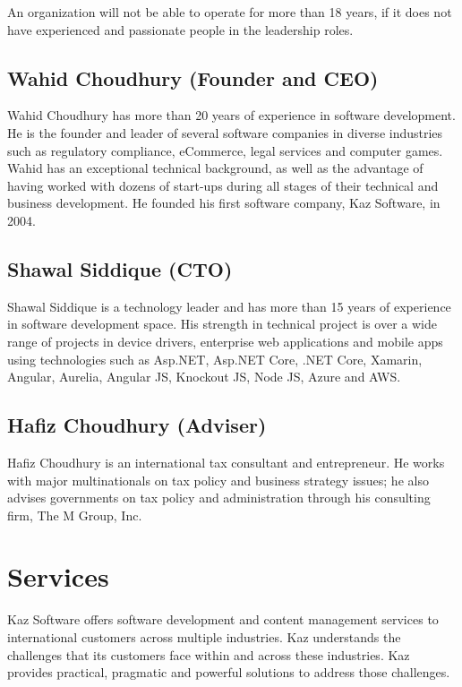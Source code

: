 An organization will not be able to operate for more than 18 years, if it does not have experienced and passionate people in the leadership roles.

\subsection[Founder and CEO]{Wahid Choudhury (Founder and CEO)}

Wahid Choudhury has more than 20 years of experience in software development.
He is the founder and leader of several software companies in diverse industries such as regulatory compliance, eCommerce, legal services and computer games. 
Wahid has an exceptional technical background, as well as the advantage of having worked with dozens of start-ups during all stages of their technical and business development. He founded his first software company, Kaz Software, in 2004.

\subsection[CTO]{Shawal Siddique (CTO)}

Shawal Siddique is a technology leader and has more than 15 years of experience in software development space.
His strength in technical project is over a wide range of projects in device drivers, enterprise web applications and mobile apps using technologies such as Asp.NET, Asp.NET Core, .NET Core, Xamarin, Angular, Aurelia, Angular JS, Knockout JS, Node JS, Azure and AWS.

\subsection[Adviser]{Hafiz Choudhury (Adviser)}

Hafiz Choudhury is an international tax consultant and entrepreneur.
He works with major multinationals on tax policy and business strategy issues; he also advises governments on tax policy and administration through his consulting firm, The M Group, Inc.

\section{Services}

Kaz Software offers software development and content management services to international customers across multiple industries.
Kaz understands the challenges that its customers face within and across these industries.
Kaz provides practical, pragmatic and powerful solutions to address those challenges.

